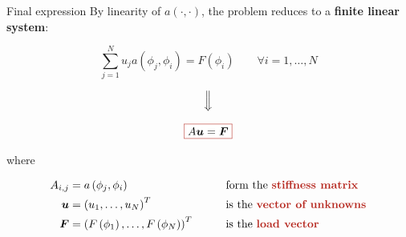 \begin{frame}{Final expression}
   By linearity of $a(\cdot,\cdot)$, the problem reduces to a \textbf{finite linear system}:

   \begin{equation*}
      \sum_{j=1}^Nu_ja\left(\phi_j,\phi_i\right)=F\left(\phi_i\right) \qquad \forall i=1,\dots,N
   \end{equation*}

   \vspace{-0.1cm}

   \begin{equation*}
      \Big\Downarrow
   \end{equation*}

   \vspace{-0.1cm}

   \begin{equation*}
      \fcolorbox{BrickRed}{white}{\text{$A\boldsymbol{u}=\boldsymbol{F}$}}
   \end{equation*}

   \pause

   where

   \begin{alignat*}{2}
      A_{i,j}&=a\left(\phi_j,\phi_i\right) &&\text{form the \textbf{\textcolor{BrickRed}{stiffness matrix}}}\\
      \boldsymbol{u}&=\left(u_1,\dots,u_N\right)^T &&\text{is the \textbf{\textcolor{BrickRed}{vector of unknowns}}}\\
      \boldsymbol{F}&=\left(F\left(\phi_1\right),\dots,F\left(\phi_N\right)\right)^T \qquad &&\text{is the \textbf{\textcolor{BrickRed}{load vector}}} 
   \end{alignat*}
\end{frame}

